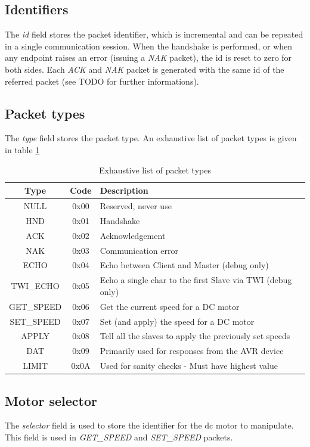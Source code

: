 \documentclass[binding=0.6cm,Lau]{sapthesis}
\begin{document}
\subsection{Identifiers}
The \emph{id} field stores the packet identifier, which is incremental and can
be repeated in a single communication session. When the handshake is performed,
or when any endpoint raises an error (issuing a \emph{NAK} packet), the id is
reset to zero for both sides. Each \emph{ACK} and \emph{NAK} packet is
generated with the same id of the referred packet (see TODO for further
informations).

\subsection{Packet types}
The \emph{type} field stores the packet type. An exhaustive list of packet types
is given in table \ref{tab:packet-types}

\begin{table}[bh]
  \begin{tabularx}{\textwidth}{c c X}
    \toprule
    Type & Code & Description \\
    \midrule
    NULL       & 0x00 & Reserved, never use \\
    HND        & 0x01 & Handshake \\
    ACK        & 0x02 & Acknowledgement \\
    NAK        & 0x03 & Communication error \\
    ECHO       & 0x04 & Echo between Client and Master (debug only)\\
    TWI\_ECHO  & 0x05 & Echo a single char to the first Slave via TWI (debug only)\\
    GET\_SPEED & 0x06 & Get the current speed for a DC motor \\
    SET\_SPEED & 0x07 & Set (and apply) the speed for a DC motor \\
    APPLY      & 0x08 & Tell all the slaves to apply the previously set speeds \\
    DAT        & 0x09 & Primarily used for responses from the AVR device \\
    LIMIT      & 0x0A & Used for sanity checks - Must have highest value \\
    \bottomrule
  \end{tabularx}
  \caption{Exhaustive list of packet types}
  \label{tab:packet-types}
\end{table}

\subsection{Motor selector}
The \emph{selector} field is used to store the identifier for the dc motor to
manipulate. This field is used in \emph{GET\_SPEED} and \emph{SET\_SPEED} packets.
\end{document}

